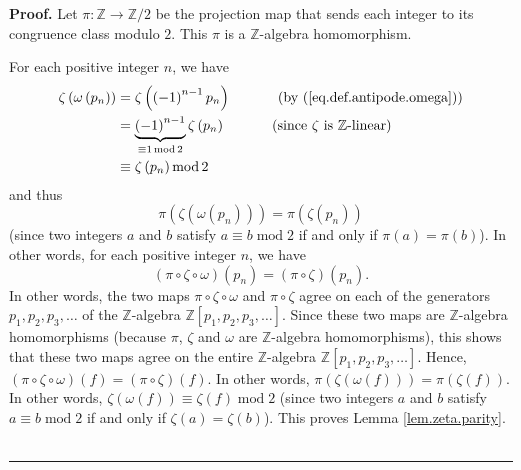 \documentclass[numbers=enddot,12pt,final,onecolumn,notitlepage]{scrartcl}%
\numberwithin{exer}{section}
\theoremstyle{definition}
\newenvironment{proof}[1][Proof]{\noindent\textbf{#1.} }{\ \rule{0.5em}{0.5em}}
\begin{document}
\begin{proof}
Let $\pi:\mathbb{Z}\rightarrow\mathbb{Z}/2$ be the projection map that sends
each integer to its congruence class modulo $2$. This $\pi$ is a $\mathbb{Z}%
$-algebra homomorphism.

For each positive integer $n$, we have
\begin{align*}
\zeta\left(  \omega\left(  p_{n}\right)  \right)   &  =\zeta\left(  \left(
-1\right)  ^{n-1}p_{n}\right)  \ \ \ \ \ \ \ \ \ \ \left(  \text{by
(\ref{eq.def.antipode.omega})}\right) \\
&  =\underbrace{\left(  -1\right)  ^{n-1}}_{\equiv1\operatorname{mod}2}%
\zeta\left(  p_{n}\right)  \ \ \ \ \ \ \ \ \ \ \left(  \text{since }%
\zeta\text{ is }\mathbb{Z}\text{-linear}\right) \\
&  \equiv\zeta\left(  p_{n}\right)  \operatorname{mod}2
\end{align*}
and thus%
\[
\pi\left(  \zeta\left(  \omega\left(  p_{n}\right)  \right)  \right)
=\pi\left(  \zeta\left(  p_{n}\right)  \right)
\]
(since two integers $a$ and $b$ satisfy $a\equiv b\operatorname{mod}2$ if and
only if $\pi\left(  a\right)  =\pi\left(  b\right)  $). In other words, for
each positive integer $n$, we have%
\[
\left(  \pi\circ\zeta\circ\omega\right)  \left(  p_{n}\right)  =\left(
\pi\circ\zeta\right)  \left(  p_{n}\right)  .
\]
In other words, the two maps $\pi\circ\zeta\circ\omega$ and $\pi\circ\zeta$
agree on each of the generators $p_{1},p_{2},p_{3},\ldots$ of the $\mathbb{Z}%
$-algebra $\mathbb{Z}\left[  p_{1},p_{2},p_{3},\ldots\right]  $. Since these
two maps are $\mathbb{Z}$-algebra homomorphisms (because $\pi$, $\zeta$ and
$\omega$ are $\mathbb{Z}$-algebra homomorphisms), this shows that these two
maps agree on the entire $\mathbb{Z}$-algebra $\mathbb{Z}\left[  p_{1}%
,p_{2},p_{3},\ldots\right]  $. Hence, $\left(  \pi\circ\zeta\circ
\omega\right)  \left(  f\right)  =\left(  \pi\circ\zeta\right)  \left(
f\right)  $. In other words, $\pi\left(  \zeta\left(  \omega\left(  f\right)
\right)  \right)  =\pi\left(  \zeta\left(  f\right)  \right)  $. In other
words, $\zeta\left(  \omega\left(  f\right)  \right)  \equiv\zeta\left(
f\right)  \operatorname{mod}2$ (since two integers $a$ and $b$ satisfy
$a\equiv b\operatorname{mod}2$ if and only if $\zeta\left(  a\right)
=\zeta\left(  b\right)  $). This proves Lemma \ref{lem.zeta.parity}.
\end{proof}
\end{document}

